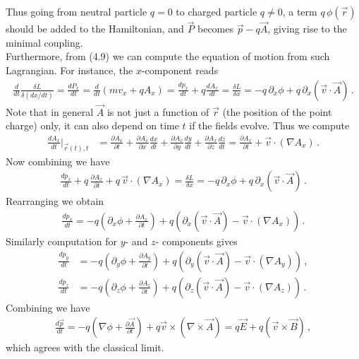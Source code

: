 \documentclass[11pt, onesided]{book}
\theoremstyle{break}
\theoremstyle{break}
\newcommand{\pd}{\partial}
\begin{document}
Thus going from neutral particle $q=0$ to charged particle $q\neq 0$, a term $q\, \phi(\vec{r})$ should be added to the Hamiltonian, and $\vec{P}$ becomes $\vec{p}-q\vec{A}$, giving rise to the minimal coupling. \\

Furthermore, from (4.9) we can compute the equation of motion from such Lagrangian. For instance, the $x$-component reads
\begin{align*}
\frac{d}{dt}\frac{\delta L}{\delta (dx/dt)} =\frac{dP_x}{dt} =\frac{d}{dt}\left( mv_x + qA_x\right) =\frac{dp_x}{dt} + q \frac{dA_x}{dt}= \frac{\delta L}{\delta x}=  -q \, \pd_x \phi + q\, \pd_x(\vec{v}\cdot \vec{A})\,.
\end{align*}
Note that in general $\vec{A}$ is not just a function of $\vec{r}$ (the position of the point charge) only, it can also depend on time $t$ if the fields evolve. Thus we compute
\begin{align*}
\frac{dA_x}{dt}|_{\vec{r}(t), t} 
&= \frac{\pd A_x}{\pd t} + \frac{\pd A_x}{\pd x} \frac{dx}{dt} + \frac{\pd A_x}{\pd y} \frac{dy}{dt}+ \frac{\pd A_x}{\pd z} \frac{dz}{dt}=\frac{\pd A_x}{\pd t} + \vec{v}\cdot (\nabla A_x)\,.
\end{align*}
Now combining we have
\begin{align*}
\frac{dp_x}{dt} + q \, \frac{\pd A_x}{\pd t} + q\,\vec{v}\cdot (\nabla A_x) = \frac{\delta L}{\delta x} = -q \, \pd_x \phi + q\, \pd_x(\vec{v}\cdot \vec{A})\,.
\end{align*}
Rearranging we obtain
\begin{align*}
\frac{dp_x}{dt} = -q\left(\pd_x\phi + \frac{\pd A_x}{\pd t}\right) + q\left( \pd_x (\vec{v}\cdot \vec{A}) - \vec{v}\cdot (\nabla A_x)\right)\,.
\end{align*}
Similarly computation for $y$- and $z$- components gives 
\begin{align*}
\frac{dp_y}{dt} &= -q\left(\pd_y\phi + \frac{\pd A_y}{\pd t}\right) + q\left( \pd_y (\vec{v}\cdot \vec{A}) - \vec{v}\cdot (\nabla A_y)\right)\,,\\
\frac{dp_z}{dt} &= -q\left(\pd_z\phi + \frac{\pd A_z}{\pd t}\right) + q\left( \pd_z (\vec{v}\cdot \vec{A}) - \vec{v}\cdot (\nabla A_z)\right)\,.
\end{align*}
Combining we have
\begin{align*}
\frac{d\vec{p}}{dt} = -q\left(  \nabla \phi + \frac{\pd \vec{A}}{\pd t}\right) + q \vec{v}\times (\nabla \times\vec{A}) =  q\vec{E}  + q (\vec{v}\times \vec{B})\,,
\end{align*}
which agrees with the classical limit.\\
\end{document}
